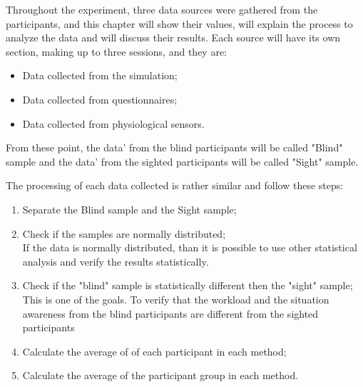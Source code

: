 


Throughout the experiment, three data sources were gathered from the participants, and this chapter will show their values, will explain the process to analyze the data and will discuss their results. Each source will have its own section, making up to three sessions, and they are:

\begin{itemize}
    \item Data collected from the simulation;
    \item Data collected from questionnaires;
    \item Data collected from physiological sensors.
\end{itemize}

From these point, the data' from the blind participants will be called "Blind" sample and the data' from the sighted participants will be called "Sight" sample.

The processing of each data collected is rather similar and follow these steps:
\begin{enumerate}
    \item Separate the Blind sample and the Sight sample;
    \item Check if the samples are normally distributed; \label{itm:results_shapiro} \\
        If the data is normally distributed, than it is possible to use other statistical analysis and verify the results statistically.
    \item Check if the "blind" sample is statistically different then the "sight" sample; \label{itm:results_t_test} \\ 
        This is one of the goals. To verify that the workload and the situation awareness from the blind participants are different from the sighted participants
    \item Calculate the average of of each participant in each method; \label{itm:results_average_method_particpant}
    \item Calculate the average of the participant group in each method. \label{itm:results_average_method}
\end{enumerate}


